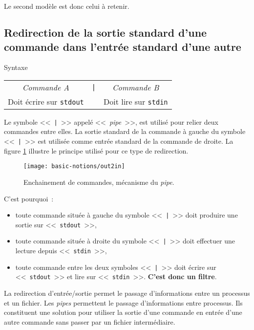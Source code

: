Le second mod{\`e}le est donc celui {\`a} retenir.

\subsection{Redirection de la sortie standard d'une commande dans
		l'entr{\'e}e standard d'une autre}

\begin{definition}{Syntaxe}
\begin{tabular}{ccc}
	\textsl{Commande A}				&	\texttt{|}	&	\textsl{Commande B}	\\
	Doit {\'e}crire sur \texttt{stdout}	&			&	Doit lire sur \texttt{stdin}\\
\end{tabular}
\end{definition}

Le symbole <<~\texttt{|}~>> appel{\'e} <<~\textsl{pipe}~>>, est
utilis{\'e} pour relier deux commandes entre elles. La
sortie standard de la
commande {\`a} gauche du symbole <<~\texttt{|}~>> est utilis{\'e}e comme
entr{\'e}e standard de
la commande de droite. La figure \ref{fig-basnot-out2in} illustre le
principe utilis{\'e} pour ce type de redirection.

\begin{figure}[hbtp]
	\centering
	\texttt{[image: basic-notions/out2in]}
	\caption{\label{fig-basnot-out2in}Enchainement de commandes, m{\'e}canisme du \textsl{pipe}.}
\end{figure}

C'est pourquoi~:
\begin{itemize}
	\item	toute commande situ{\'e}e {\`a} gauche du symbole <<~\texttt{|}~>> doit produire une
			sortie sur <<~\texttt{stdout}~>>,
	\item	toute commande situ{\'e}e {\`a} droite du symbole <<~\texttt{|}~>> doit effectuer une
			lecture depuis <<~\texttt{stdin}~>>,
	\item	toute commande entre les deux symboles <<~\texttt{|}~>> doit {\'e}crire sur
			<<~\texttt{stdout}~>> et lire sur <<~\texttt{stdin}~>>. {\bf C'est donc un filtre}.
\end{itemize}

La redirection d'entr{\'e}e/sortie permet le passage d'informations entre un
processus et un fichier. Les \textsl{pipes} permettent le passage d'informations
entre processus. Ils constituent une solution pour utiliser la
sortie d'une commande en entr{\'e}e d'une autre commande sans passer par un
fichier interm{\'e}diaire.


